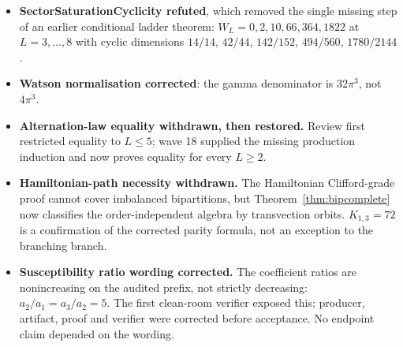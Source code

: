 \documentclass[11pt]{article}
\theoremstyle{definition}
\begin{document}
\begin{itemize}[leftmargin=*,itemsep=2pt]
      Corollary~\ref{cor:oa}.
\item \textbf{SectorSaturationCyclicity refuted}, which removed the single missing step of an earlier
      conditional ladder theorem: $W_L=0,2,10,66,364,1822$ at $L=3,\dots,8$ with cyclic dimensions
      $14/14$, $42/44$, $142/152$, $494/560$, $1780/2144$.
\item \textbf{Watson normalisation corrected}: the gamma denominator is $32\pi^3$, not $4\pi^3$.
\item \textbf{Alternation-law equality withdrawn, then restored.} Review first restricted equality
      to $L\le5$; wave 18 supplied the missing production induction and now proves equality for every
      $L\ge2$.
      
      \item \textbf{Hamiltonian-path necessity withdrawn.} The Hamiltonian Clifford-grade proof
      cannot cover imbalanced bipartitions, but Theorem~\ref{thm:bipcomplete} now classifies the
      order-independent algebra by transvection orbits. $K_{1,3}=72$ is a confirmation of the
      corrected parity formula, not an exception to the branching branch.
      \item \textbf{Susceptibility ratio wording corrected.} The coefficient ratios are
      nonincreasing on the audited prefix, not strictly decreasing:
      $a_2/a_1=a_3/a_2=5$. The first clean-room verifier exposed this; producer, artifact, proof and
      verifier were corrected before acceptance. No endpoint claim depended on the wording.
\end{itemize}
\end{document}
